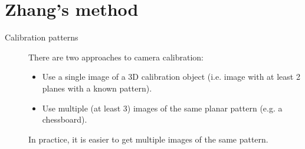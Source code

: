 \section{Zhang's method}

\begin{description}
    \item[Calibration patterns] 
        There are two approaches to camera calibration:
        \begin{itemize}
            \item Use a single image of a 3D calibration object (i.e. image with at least 2 planes with a known pattern).
            \item Use multiple (at least 3) images of the same planar pattern (e.g. a chessboard).
        \end{itemize}

        \begin{remark}
            In practice, it is easier to get multiple images of the same pattern.
        \end{remark}
\end{description}

